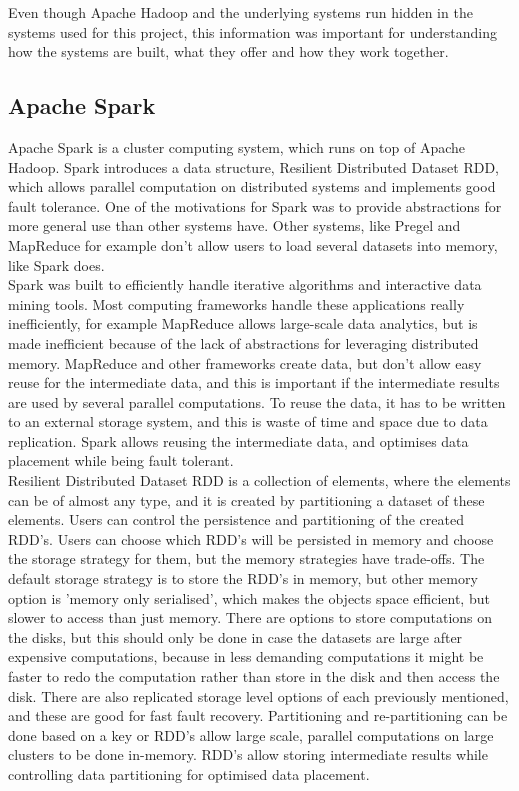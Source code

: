 \documentclass{article}
\theoremstyle{definition}
\begin{document}
Even though Apache Hadoop and the underlying systems run hidden in the systems used for this project, this information was important for understanding how the systems are built, what they offer and how they work together. 

\subsection{Apache Spark}
Apache Spark \cite{Zaharia2012} is a cluster computing system, which runs on top of Apache Hadoop. Spark introduces a data structure, Resilient Distributed Dataset RDD, which allows parallel computation on distributed systems and implements good fault tolerance. One of the motivations for Spark was to provide abstractions for more general use than other systems have. Other systems, like Pregel and MapReduce for example don't allow users to load several datasets into memory, like Spark does. \\

Spark was built to efficiently handle iterative algorithms and interactive data mining tools. Most computing frameworks handle these applications really inefficiently, for example MapReduce allows large-scale data analytics, but is made inefficient because of the lack of abstractions for leveraging distributed memory. MapReduce and other frameworks create data, but don't allow easy reuse for the intermediate data, and this is important if the intermediate results are used by several parallel computations. To reuse the data, it has to be written to an external storage system, and this is waste of time and space due to data replication. Spark allows reusing the intermediate data, and optimises data placement while being fault tolerant. \\ 

Resilient Distributed Dataset RDD is a collection of elements, where the elements can be of almost any type, and it is created by partitioning a dataset of these elements. Users can control the persistence and partitioning of the created RDD's. Users can choose which RDD's will be persisted in memory and choose the storage strategy for them, but the memory strategies have trade-offs. \cite{sparkguide} The default storage strategy is to store the RDD's in memory, but other memory option is 'memory only serialised', which makes the objects space efficient, but slower to access than just memory. There are options to store computations on the disks, but this should only be done in case the datasets are large after expensive computations, because in less demanding computations it might be faster to redo the computation rather than store in the disk and then access the disk. There are also replicated storage level options of each previously mentioned, and these are good for fast fault recovery. Partitioning and re-partitioning can be done based on a key or RDD's allow large scale, parallel computations on large clusters to be done in-memory. RDD's allow storing intermediate results while controlling data partitioning for optimised data placement. \\
\end{document}
